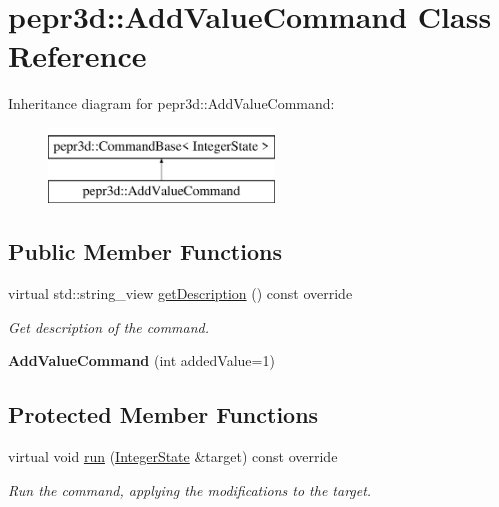 \hypertarget{classpepr3d_1_1_add_value_command}{}\section{pepr3d\+::Add\+Value\+Command Class Reference}
\label{classpepr3d_1_1_add_value_command}
Inheritance diagram for pepr3d\+::Add\+Value\+Command\+:\begin{figure}[H]
\begin{center}
\leavevmode
\includegraphics[height=2.000000cm]{classpepr3d_1_1_add_value_command}
\end{center}
\end{figure}
\subsection*{Public Member Functions}
\begin{DoxyCompactItemize}
\item 
\mbox{\label{classpepr3d_1_1_add_value_command_a8d2ff1529606aa443e872f6eb5b47a79}} 
virtual std\+::string\+\_\+view \mbox{\hyperlink{classpepr3d_1_1_add_value_command_a8d2ff1529606aa443e872f6eb5b47a79}{get\+Description}} () const override
\begin{DoxyCompactList}\small\item\em Get description of the command. \end{DoxyCompactList}\item 
\mbox{\label{classpepr3d_1_1_add_value_command_a43a418d4d88f54f4c345c63c865f6676}} 
{\bfseries Add\+Value\+Command} (int added\+Value=1)
\end{DoxyCompactItemize}
\subsection*{Protected Member Functions}
\begin{DoxyCompactItemize}
\item 
\mbox{\label{classpepr3d_1_1_add_value_command_a0663c6c8ac659393304a13c1f9089865}} 
virtual void \mbox{\hyperlink{classpepr3d_1_1_add_value_command_a0663c6c8ac659393304a13c1f9089865}{run}} (\mbox{\hyperlink{structpepr3d_1_1_integer_state}{Integer\+State}} \&target) const override
\begin{DoxyCompactList}\small\item\em Run the command, applying the modifications to the target. \end{DoxyCompactList}\end{DoxyCompactItemize}
